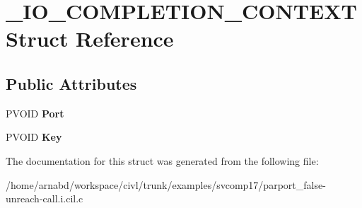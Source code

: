 \hypertarget{struct__IO__COMPLETION__CONTEXT}{}\section{\+\_\+\+I\+O\+\_\+\+C\+O\+M\+P\+L\+E\+T\+I\+O\+N\+\_\+\+C\+O\+N\+T\+E\+X\+T Struct Reference}
\label{struct__IO__COMPLETION__CONTEXT}
\subsection*{Public Attributes}
\begin{DoxyCompactItemize}
\item 
\hypertarget{struct__IO__COMPLETION__CONTEXT_abea6308f19622687acecd26b35d313e4}{}P\+V\+O\+I\+D {\bfseries Port}\label{struct__IO__COMPLETION__CONTEXT_abea6308f19622687acecd26b35d313e4}

\item 
\hypertarget{struct__IO__COMPLETION__CONTEXT_a3282ca93443987594f16f26e33b97e7d}{}P\+V\+O\+I\+D {\bfseries Key}\label{struct__IO__COMPLETION__CONTEXT_a3282ca93443987594f16f26e33b97e7d}

\end{DoxyCompactItemize}


The documentation for this struct was generated from the following file\+:\begin{DoxyCompactItemize}
\item 
/home/arnabd/workspace/civl/trunk/examples/svcomp17/parport\+\_\+false-\/unreach-\/call.\+i.\+cil.\+c\end{DoxyCompactItemize}
